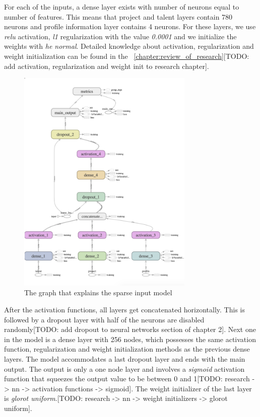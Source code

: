 For each of the inputs, a dense layer exists with number of neurons equal to number of features. This means that project and talent layers contain 780 neurons and profile information layer contains 4 neurons. For these layers, we use \textit{relu} activation, \textit{l1} regularization with the value \textit{0.0001} and we initialize the weights with \textit{he normal}. Detailed knowledge about activation, regularization and weight initialization can be found in the ~\autoref{chapter:review_of_research}[TODO: add activation, regularization and weight init to research chapter].


 \begin{figure}[h]
	\centering
	\includegraphics[width=0.75\textwidth]{figures/TensorBoardSparseCropped.png}
	\caption{The graph that explains the sparse input model}
	\label{fig:tensor-board-sparse}
\end{figure}


After the activation functions, all layers get concatenated horizontally. This is followed by a dropout layer with half of the neurons are disabled randomly[TODO: add dropout to neural networks section of chapter 2]. Next one in the model is a dense layer with 256 nodes, which possesses the same activation function, regularization and weight initialization methods as the previous dense layers. The model accommodates a last dropout layer and ends with the main output. The output is only a one node layer and involves a \textit{sigmoid} activation function that squeezes the output value to be between 0 and 1[TODO: research -> nn -> activation functions -> sigmoid]. The weight initializer of the last layer is \textit{glorot uniform}.[TODO: research -> nn -> weight initializers -> glorot uniform].

